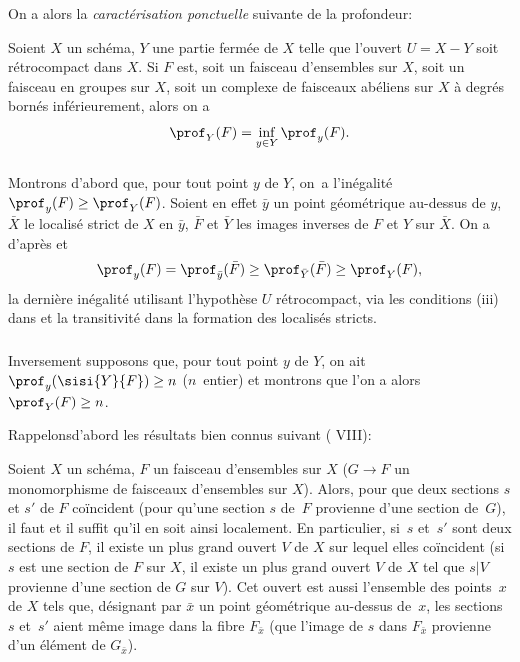 On a alors la \textit{caract\'erisation ponctuelle} suivante de la profondeur:

\begin{theoreme} \label{XIV.1.8} Soient $X$ un sch\'ema, $Y$ une partie ferm\'ee de $X$ telle que l'ouvert $U=X-Y$ soit r\'etrocompact dans $X$. Si $F$ est, soit un faisceau d'ensembles sur $X$, soit un faisceau en groupes sur $X$, soit un complexe de faisceaux ab\'eliens sur $X$ \`a degr\'es born\'es inf\'erieurement, alors on a
$$
\prof_Y(F)=\inf_{y\in Y} \prof_y(F).
$$
\end{theoreme}

\subsubsection{} \label{XIV.1.8.1} Montrons d'abord que, pour tout point $y$ de $Y$, on~a l'in\'egalit\'e $\prof_y(F)\geq \prof_Y(F)$. Soient en effet $\bar y$ un point g\'eom\'etrique au-dessus de $y$, $\bar X$ le localis\'e strict de $X$ en $\bar y$, $\bar F$ et $\bar Y$ les images inverses de $F$ et $Y$ sur $\bar X$. On a d'apr\`es  et 
$$
\prof_y(F)=\prof_{\bar y}(\bar F)\geq \prof_{\bar Y}(\bar F)\geq \prof_Y(F),
$$
la derni\`ere in\'egalit\'e utilisant l'hypoth\`ese \og $U$ r\'etrocompact\fg, via les conditions \textup{(iii)} dans  et la transitivit\'e dans la formation des localis\'es stricts.

\subsubsection{} \label{XIV.1.8.2}
Inversement supposons que, pour tout point $y$ de $Y$, on ait $\prof_y(\sisi{Y}{F})\geq n$ ($n$~entier) et montrons que l'on a alors $\prof_Y(F)\geq n$.

Rappelons\pageoriginale d'abord les r\'esultats bien connus suivant \textup{( VIII)}:

\begin{subsublemme} \label{XIV.1.8.2.1}
Soient $X$ un sch\'ema, $F$ un faisceau d'ensembles sur $X$ (\resp $G\to F$ un monomorphisme de faisceaux d'ensembles sur $X$). Alors, pour que deux sections $s$ et $s'$ de $F$ co\"incident (\resp pour qu'une section $s$ de~$F$ provienne d'une section de~$G$), il faut et il suffit qu'il en soit ainsi localement. En particulier, si~$s$ et~$s'$ sont deux sections de $F$, il existe un plus grand ouvert $V$ de $X$ sur lequel elles co\"incident (\resp si $s$ est une section de $F$ sur $X$, il existe un plus grand ouvert $V$ de $X$ tel que $s|V$ provienne d'une section de $G$ sur $V$). Cet ouvert est aussi l'ensemble des points~$x$ de $X$ tels que, d\'esignant par $\bar x$ un point g\'eom\'etrique au-dessus de~$x$, les sections~$s$ et~$s'$ aient m\^eme image dans la fibre $F_{\bar x}$ (\resp que l'image de $s$ dans $F_{\bar x}$ provienne d'un \'el\'ement de $G_{\bar x}$).
\end{subsublemme}

